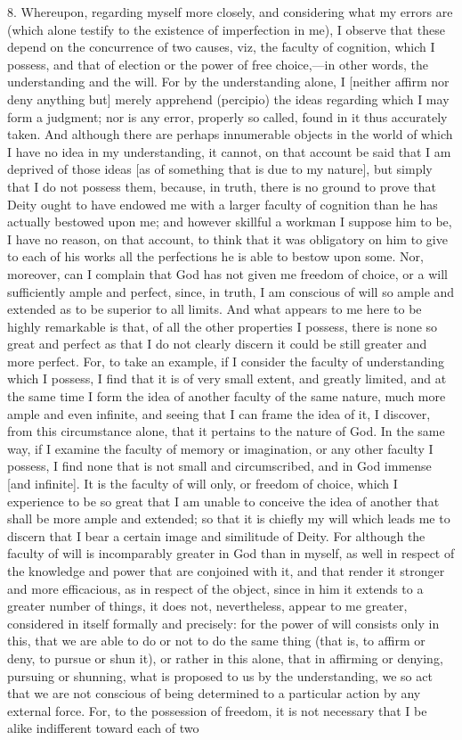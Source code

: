 8. Whereupon, regarding myself more closely, and considering what my errors are (which alone testify to the existence of imperfection in me), I observe that these depend on the concurrence of two causes, viz, the faculty of cognition, which I possess, and that of election or the power of free choice,—in other words, the understanding and the will. For by the understanding alone, I [neither affirm nor deny anything but] merely apprehend (percipio) the ideas regarding which I may form a judgment; nor is any error, properly so called, found in it thus accurately taken. And although there are perhaps innumerable objects in the world of which I have no idea in my understanding, it cannot, on that account be said that I am deprived of those ideas [as of something that is due to my nature], but simply that I do not possess them, because, in truth, there is no ground to prove that Deity ought to have endowed me with a larger faculty of cognition than he has actually bestowed upon me; and however skillful a workman I suppose him to be, I have no reason, on that account, to think that it was obligatory on him to give to each of his works all the perfections he is able to bestow upon some. Nor, moreover, can I complain that God has not given me freedom of choice, or a will sufficiently ample and perfect, since, in truth, I am conscious of will so ample and extended as to be superior to all limits. And what appears to me here to be highly remarkable is that, of all the other properties I possess, there is none so great and perfect as that I do not clearly discern it could be still greater and more perfect. For, to take an example, if I consider the faculty of understanding which I possess, I find that it is of very small extent, and greatly limited, and at the same time I form the idea of another faculty of the same nature, much more ample and even infinite, and seeing that I can frame the idea of it, I discover, from this circumstance alone, that it pertains to the nature of God. In the same way, if I examine the faculty of memory or imagination, or any other faculty I possess, I find none that is not small and circumscribed, and in God immense [and infinite]. It is the faculty of will only, or freedom of choice, which I experience to be so great that I am unable to conceive the idea of another that shall be more ample and extended; so that it is chiefly my will which leads me to discern that I bear a certain image and similitude of Deity. For although the faculty of will is incomparably greater in God than in myself, as well in respect of the knowledge and power that are conjoined with it, and that render it stronger and more efficacious, as in respect of the object, since in him it extends to a greater number of things, it does not, nevertheless, appear to me greater, considered in itself formally and precisely: for the power of will consists only in this, that we are able to do or not to do the same thing (that is, to affirm or deny, to pursue or shun it), or rather in this alone, that in affirming or denying, pursuing or shunning, what is proposed to us by the understanding, we so act that we are not conscious of being determined to a particular action by any external force. For, to the possession of freedom, it is not necessary that I be alike indifferent toward each of two 